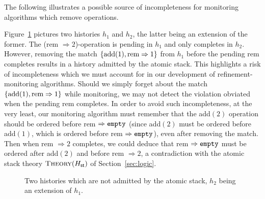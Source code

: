 The following illustrates a possible source of incompleteness for monitoring
algorithms which remove operations.

\begin{example}
  \label{ex:removal_no_saturation}

  Figure~\ref{fig:removal_no_saturation} pictures two histories $h_1$ and
  $h_2$, the latter being an extension of the former. The (rem $\Rightarrow
  2$)-operation is pending in $h_1$ and only completes in $h_2$. However,
  removing the match ${\{  \text{add}(1), \text{rem}\Rightarrow 1  \}}$ from $h_1$
  before the pending rem completes results in a history admitted by the
  atomic stack. This highlights a risk of incompleteness which we must account
  for in our development of refinement-monitoring algorithms. Should we simply
  forget about the match ${\{  \text{add}(1), \text{rem} \Rightarrow 1 \}}$ while
  monitoring, we may not detect the violation obviated when the pending
  rem completes. In order to avoid such incompleteness, at the very least,
  our monitoring algorithm must remember that the add$(2)$ operation
  should be ordered before rem $\Rightarrow {\tt empty}$ (since
  add$(2)$ must be ordered before add$(1)$, which is ordered before
  rem $\Rightarrow {\tt empty}$), even after removing the match. Then
  when rem $\Rightarrow 2$ completes, we could deduce that rem 
  $\Rightarrow {\tt empty}$ must be ordered after add$(2)$ and before rem
  $\Rightarrow 2$, a contradiction with the atomic stack theory
  $\textsc{Theory}(H_{\sf st})$ of Section~\ref{sec:logic}.

\end{example}

\begin{figure}
  
  \caption{Two histories which are not admitted by the atomic stack, $h_2$
  being an extension of $h_1$.}
  \label{fig:removal_no_saturation}
\end{figure}
